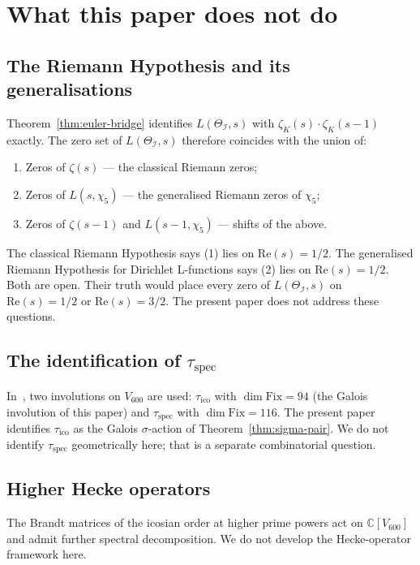 \documentclass[11pt,a4paper]{article}
\theoremstyle{definition}
\theoremstyle{remark}
\newcommand{\C}{\mathbb{C}}
\newcommand{\II}{\mathcal{I}}
\begin{document}
\section{What this paper does not do}\label{sec:open}

\subsection{The Riemann Hypothesis and its generalisations}

Theorem~\ref{thm:euler-bridge} identifies $L(\Theta_\II, s)$ with
$\zeta_K(s)\!\cdot\!\zeta_K(s-1)$ exactly. The zero set of
$L(\Theta_\II, s)$ therefore coincides with the union of:
\begin{enumerate}
  \item Zeros of $\zeta(s)$ — the classical Riemann zeros;
  \item Zeros of $L(s, \chi_5)$ — the generalised Riemann zeros of $\chi_5$;
  \item Zeros of $\zeta(s-1)$ and $L(s-1, \chi_5)$ — shifts of the above.
\end{enumerate}
The classical Riemann Hypothesis says (1) lies on $\mathrm{Re}(s) = 1/2$. The
generalised Riemann Hypothesis for Dirichlet L-functions says (2) lies on
$\mathrm{Re}(s) = 1/2$. Both are open. Their truth would place every zero of
$L(\Theta_\II, s)$ on $\mathrm{Re}(s) = 1/2$ or $\mathrm{Re}(s) = 3/2$. The
present paper does not address these questions.

\subsection{The identification of $\tau_\mathrm{spec}$}

In~\cite{existenceClosure}, two involutions on $V_{600}$ are used: $\tau_\mathrm{ico}$
with $\dim \mathrm{Fix} = 94$ (the Galois involution of this paper) and
$\tau_\mathrm{spec}$ with $\dim \mathrm{Fix} = 116$. The present paper identifies
$\tau_\mathrm{ico}$ as the Galois $\sigma$-action of Theorem~\ref{thm:sigma-pair}.
We do not identify $\tau_\mathrm{spec}$ geometrically here; that is a separate
combinatorial question.

\subsection{Higher Hecke operators}

The Brandt matrices of the icosian order at higher prime powers act on
$\C[V_{600}]$ and admit further spectral decomposition. We do not develop the
Hecke-operator framework here.
\end{document}
